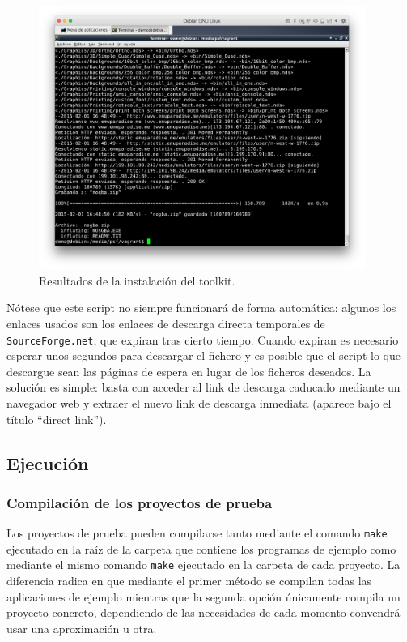 \begin{figure}[h!]
	\caption{Resultados de la instalación del toolkit.}
	\label{fig:dependency}
	\centering
	\includegraphics[width=0.95\textwidth]{P1Media/Toolkit}
\end{figure}

	Nótese que este script no siempre funcionará de forma automática: algunos los enlaces usados son los enlaces de descarga directa temporales de {\tt SourceForge.net}, que expiran tras cierto tiempo. Cuando expiran es necesario esperar unos segundos para descargar el fichero y es posible que el script lo que descargue sean las páginas de espera en lugar de los ficheros deseados. La solución es simple: basta con acceder al link de descarga caducado mediante un navegador web y extraer el nuevo link de descarga inmediata (aparece bajo el título ``direct link'').
	
	\newpage
	
	\subsection{Ejecución}
	
	\subsubsection{Compilación de los proyectos de prueba}
	
	Los proyectos de prueba pueden compilarse tanto mediante el comando {\tt make} ejecutado en la raíz de la carpeta que contiene los programas de ejemplo como mediante el mismo comando {\tt make} ejecutado en la carpeta de cada proyecto. La diferencia radica en que mediante el primer método se compilan todas las aplicaciones de ejemplo mientras que la segunda opción únicamente compila un proyecto concreto, dependiendo de las necesidades de cada momento convendrá usar una aproximación u otra.
	
